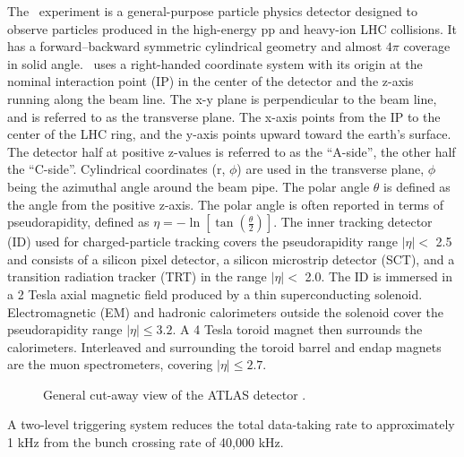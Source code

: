 The \ATLAS\ experiment is a general-purpose particle physics detector designed to observe particles produced in the high-energy pp and heavy-ion LHC collisions.
It has a forward–backward symmetric cylindrical geometry and almost $4\pi$ coverage in solid angle.
\ATLAS\ uses a right-handed coordinate system with its origin at the nominal interaction point (IP) in the center of the detector and the z-axis running along the beam line.
The x-y plane is perpendicular to the beam line, and is referred to as the transverse plane.
The x-axis points from the IP to the center of the LHC ring, and the y-axis points upward toward the earth's surface.
The detector half at positive z-values is referred to as the ``A-side'', the other half the ``C-side''.
Cylindrical coordinates (r, $\phi$) are used in the transverse plane, $\phi$ being the azimuthal angle around the beam pipe.
The polar angle $\theta$ is defined as the angle from the positive z-axis. The polar angle is often reported in terms of pseudorapidity, defined as $\eta = -\ln[\tan(\frac{\theta}{2})]$.
The inner tracking detector (ID) used for charged-particle tracking covers the pseudorapidity range $|\eta|<$  2.5 and consists of a silicon pixel detector, a silicon microstrip detector (SCT), and a transition radiation tracker (TRT) in the range $|\eta|<$ 2.0. 
The ID is immersed in a 2 Tesla axial magnetic field produced by a thin superconducting solenoid.
Electromagnetic (EM) and hadronic calorimeters outside the solenoid cover the pseudorapidity range $|\eta|\leq 3.2$.
A 4 Tesla toroid magnet then surrounds the calorimeters.
Interleaved and surrounding the toroid barrel and endap magnets are the muon spectrometers, covering $|\eta|\leq 2.7$.
\begin{figure}[h]
  \begin{center}
  \end{center}
  \caption[General cut-away view of the ATLAS detector.]
          {General cut-away view of the ATLAS detector \cite{PERF-2007-01}.}
  \label{fig:detector:ATLAS}
\end{figure}
A two-level triggering system reduces the total data-taking rate to approximately 1 kHz from the bunch crossing rate of 40,000 kHz.
